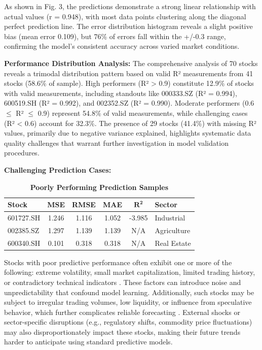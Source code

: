 \documentclass[3p,times,procedia]{elsarticle}
\begin{document}
As shown in Fig. 3, the predictions demonstrate a strong linear relationship with actual values (r = 0.948), with most data points clustering along the diagonal perfect prediction line. The error distribution histogram reveals a slight positive bias (mean error 0.109), but 76\% of errors fall within the +/-0.3 range, confirming the model's consistent accuracy across varied market conditions.

\textbf{Performance Distribution Analysis:} The comprehensive analysis of 70 stocks reveals a trimodal distribution pattern based on valid R² measurements from 41 stocks (58.6\% of sample). High performers (R² > 0.9) constitute 12.9\% of stocks with valid measurements, including standouts like 000333.SZ (R² = 0.994), 600519.SH (R² = 0.992), and 002352.SZ (R² = 0.990). Moderate performers (0.6 $\leq$ R² $\leq$ 0.9) represent 54.8\% of valid measurements, while challenging cases (R² < 0.6) account for 32.3\%. The presence of 29 stocks (41.4\%) with missing R² values, primarily due to negative variance explained, highlights systematic data quality challenges that warrant further investigation in model validation procedures.

\vspace{0.3cm}

\textbf{Challenging Prediction Cases:}

\begin{table}[!ht]
\renewcommand{\arraystretch}{1.5} %
\centering
\large %
\caption{\textbf{Poorly Performing Prediction Samples}}
\begin{tabular}{|l|c|c|c|c|l|}
\hline
\textbf{Stock} & \textbf{MSE} & \textbf{RMSE} & \textbf{MAE} & \textbf{$\mathbf{R^2}$} & \textbf{Sector} \\
\hline
601727.SH & 1.246 & 1.116 & 1.052 & -3.985 & Industrial \\
002385.SZ & 1.297 & 1.139 & 1.139 & N/A    & Agriculture \\
600340.SH & 0.101 & 0.318 & 0.318 & N/A    & Real Estate \\
\hline
\end{tabular}
\end{table}

Stocks with poor predictive performance often exhibit one or more of the following: extreme volatility, small market capitalization, limited trading history, or contradictory technical indicators \cite{Malkiel2003, Campbell2001}. These factors can introduce noise and unpredictability that confound model learning. Additionally, such stocks may be subject to irregular trading volumes, low liquidity, or influence from speculative behavior, which further complicates reliable forecasting \cite{Black1976}. External shocks or sector-specific disruptions (e.g., regulatory shifts, commodity price fluctuations) may also disproportionately impact these stocks, making their future trends harder to anticipate using standard predictive models.
\end{document}
